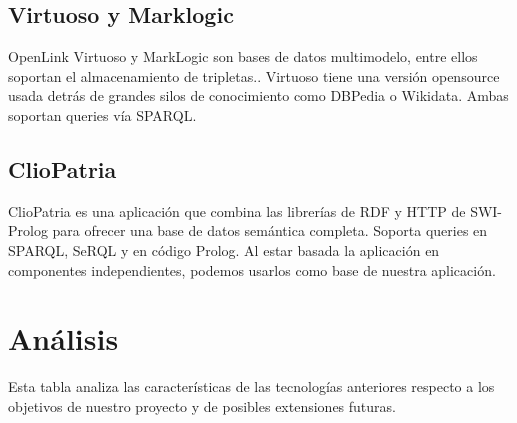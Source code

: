 \documentclass[12pt]{report} %
\begin{document}
\subsection{Virtuoso y Marklogic}
OpenLink Virtuoso y MarkLogic son bases de datos multimodelo, entre ellos soportan el almacenamiento de tripletas.\cite{virtuoso}\cite{marklogic}.
Virtuoso tiene una versión opensource usada detrás de grandes silos de conocimiento como DBPedia o Wikidata. Ambas soportan queries vía SPARQL.

\subsection{ClioPatria}
ClioPatria es una aplicación que combina las librerías de RDF y HTTP de SWI-Prolog para ofrecer una base de datos semántica completa.\cite{cliopatria}
Soporta queries en SPARQL, SeRQL y en código Prolog. Al estar basada la aplicación en componentes independientes, podemos usarlos como base de nuestra aplicación.

\section{Análisis}

Esta tabla analiza las características de las tecnologías anteriores respecto a los objetivos de nuestro proyecto y de posibles extensiones futuras.
\end{document}
